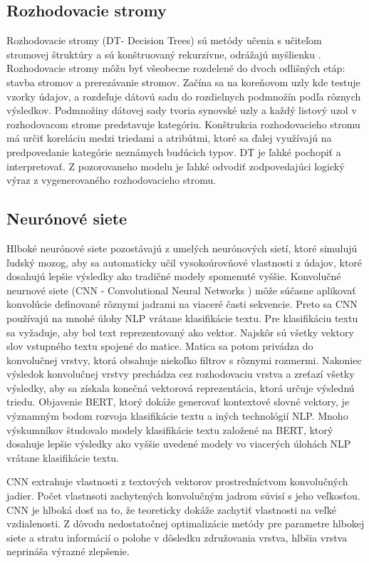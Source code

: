 \subsection*{Rozhodovacie stromy}
Rozhodovacie stromy (DT- Decision Trees) sú metódy učenia s učiteľom stromovej štruktúry a sú konštruovaný rekurzívne, odrážajú myšlienku . Rozhodovacie stromy môžu byť všeobecne rozdelené do dvoch odlišných etáp: stavba stromov a prerezávanie stromov. Začína sa na koreňovom uzly kde testuje vzorky údajov, a rozdeľuje dátovú sadu do rozdielnych podmnožín podľa rôznych výsledkov. Podmnožiny dátovej sady tvoria synovské uzly a každý listový uzol v rozhodovacom strome predstavuje kategóriu. Konštrukcia rozhodovacieho stromu má určiť koreláciu medzi triedami a atribútmi, ktoré sa ďalej využívajú na predpovedanie kategórie neznámych budúcich typov. DT je ľahké pochopiť a interpretovať. Z pozorovaneho modelu je ľahké odvodiť zodpovedajúci logický výraz z vygenerovaného rozhodovacieho stromu.

\subsection*{Neurónové siete}
Hlboké neurónové siete pozostávajú z umelých neurónových sietí, ktoré simulujú ľudský mozog, aby sa automaticky učil vysokoúrovňové vlastnosti z údajov, ktoré dosahujú lepšie výsledky ako tradičné modely spomenuté vyššie. Konvolučné neurnové siete (CNN - Convolutional Neural Networks ) môže súčasne aplikovať konvolúcie definované rôznymi jadrami na viaceré časti sekvencie. Preto sa CNN používajú na mnohé úlohy NLP vrátane klasifikácie textu. Pre klasifikáciu textu sa vyžaduje, aby bol text reprezentovaný ako vektor. Najskôr sú všetky vektory slov vstupného textu spojené do matice. Matica sa potom privádza do konvolučnej vrstvy, ktorá obsahuje niekoľko filtrov s rôznymi rozmermi. Nakoniec výsledok konvolučnej vrstvy prechádza cez rozhodovaciu vrstva a zreťazí všetky výsledky, aby sa získala konečná vektorová reprezentácia, ktorá určuje výslednú triedu. 
Objavenie BERT, ktorý dokáže generovať kontextové slovné vektory, je významným bodom rozvoja klasifikácie textu a iných technológií NLP. Mnoho výskumníkov študovalo modely klasifikácie textu založené na BERT, ktorý dosahuje lepšie výsledky ako vyššie uvedené modely vo viacerých úlohách NLP vrátane klasifikácie textu.

CNN extrahuje vlastnosti z textových vektorov prostredníctvom konvolučných jadier. Počet vlastnsoti zachytených konvolučným jadrom súvisí s jeho veľkosťou. CNN je hlboká dosť na to, že teoreticky dokáže zachytiť vlastnosti na veľké vzdialenosti. Z dôvodu nedostatočnej optimalizácie
metódy pre parametre hlbokej siete a stratu informácií o polohe v dôsledku združovania
vrstva, hlbšia vrstva neprináša výrazné zlepšenie.

